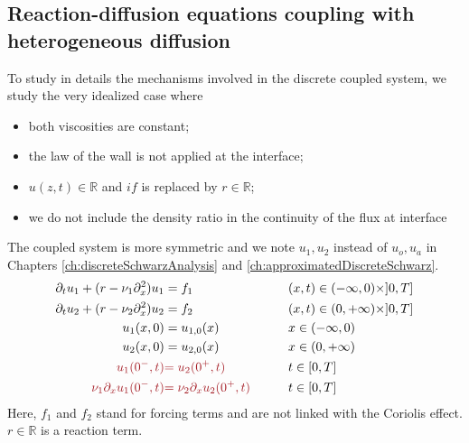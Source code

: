 \subsection{Reaction-diffusion equations coupling
with heterogeneous diffusion}
\label{sec:airseaSCM_reactionDiffusionSection}
To study in details the mechanisms involved in
the discrete coupled system, we study the very idealized
case where
\begin{itemize}
	\item both viscosities are constant;
	\item the law of the wall is not applied
		at the interface;
	\item $u(z,t) \in\mathbb{R}$ and $if$ is replaced by
		$r\in\mathbb{R}$;
	\item we do not include the density ratio
	in the continuity of the flux at interface
\end{itemize}
The coupled system is more symmetric and we note
$u_1, u_2$ instead of $u_o, u_a$ in Chapters
\ref{ch:discreteSchwarzAnalysis} and
\ref{ch:approximatedDiscreteSchwarz}.
\begin{subequations}
\begin{align}
\partial_t u_1 +( r - \nu_1 \partial_x^2) u_1 &= f_1  &\qquad& (x,t) \in (-\infty,0) \times ]0,T] \label{eq:airseaSCM_dr1} \\
\partial_t u_2 + ( r - \nu_2 \partial_x^2) u_2  &= f_2  &\qquad& (x,t) \in (0,+\infty) \times ]0,T] \label{eq:airseaSCM_dr2}\\
	u_1(x,0) &= u_{1,0}(x)   &\qquad&  x \in (-\infty,0)
	\label{eq:airseaSCM_initialCond1} \\
u_2(x,0) &= u_{2,0}(x)   &\qquad&  x \in (0,+\infty)
	\label{eq:airseaSCM_initialCond2} \\
	\emphase{u_1(0^-,t)} &\emphase{=  u_2(0^+,t)}
	&\qquad& t \in [0,T] \label{eq:airseaSCM_interface-dir} \\
	\emphase{\nu_1 \partial_x u_1(0^-,t)} &
	\emphase{= \nu_2 \partial_x u_2(0^+,t)} &\qquad& t \in [0,T] \label{eq:airseaSCM_interface-neu} 
\end{align}
\label{eq:model-problem}
\end{subequations}
Here, $f_1$ and $f_2$
stand for forcing terms and are not linked with the Coriolis effect.
$r\in \mathbb{R}$ is a reaction term.

